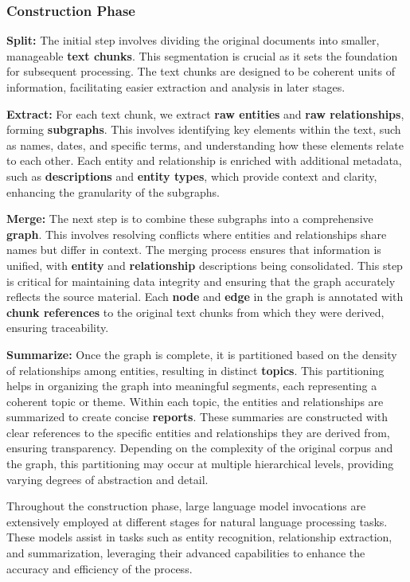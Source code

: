 \subsubsection{Construction Phase}
\label{Construction Phase}

\textbf{Split:} The initial step involves dividing the original documents into smaller, manageable \textbf{text chunks}. This segmentation is crucial as it sets the foundation for subsequent processing. The text chunks are designed to be coherent units of information, facilitating easier extraction and analysis in later stages.

\textbf{Extract:} For each text chunk, we extract \textbf{raw entities} and \textbf{raw relationships}, forming \textbf{subgraphs}. This involves identifying key elements within the text, such as names, dates, and specific terms, and understanding how these elements relate to each other. Each entity and relationship is enriched with additional metadata, such as \textbf{descriptions} and \textbf{entity types}, which provide context and clarity, enhancing the granularity of the subgraphs.

\textbf{Merge:} The next step is to combine these subgraphs into a comprehensive \textbf{graph}. This involves resolving conflicts where entities and relationships share names but differ in context. The merging process ensures that information is unified, with \textbf{entity} and \textbf{relationship} descriptions being consolidated. This step is critical for maintaining data integrity and ensuring that the graph accurately reflects the source material. Each \textbf{node} and \textbf{edge} in the graph is annotated with \textbf{chunk references} to the original text chunks from which they were derived, ensuring traceability.

\textbf{Summarize:} Once the graph is complete, it is partitioned based on the density of relationships among entities, resulting in distinct \textbf{topics}. This partitioning helps in organizing the graph into meaningful segments, each representing a coherent topic or theme. Within each topic, the entities and relationships are summarized to create concise \textbf{reports}. These summaries are constructed with clear references to the specific entities and relationships they are derived from, ensuring transparency. Depending on the complexity of the original corpus and the graph, this partitioning may occur at multiple hierarchical levels, providing varying degrees of abstraction and detail.

Throughout the construction phase, large language model invocations are extensively employed at different stages for natural language processing tasks. These models assist in tasks such as entity recognition, relationship extraction, and summarization, leveraging their advanced capabilities to enhance the accuracy and efficiency of the process.

